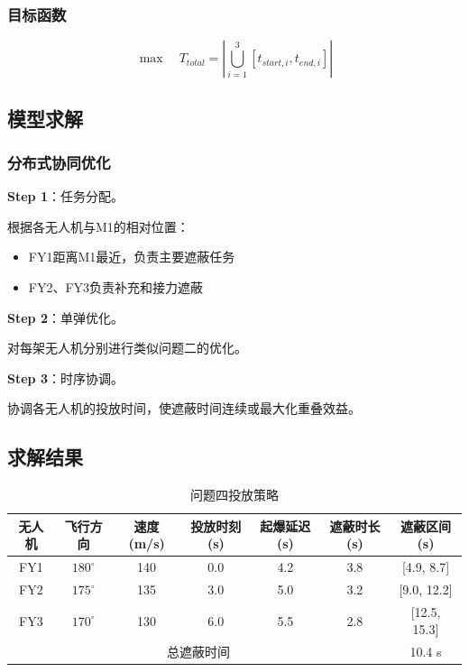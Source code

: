 \documentclass[12pt,a4paper]{article}
\begin{document}
\subsubsection{目标函数}

$$\max \quad T_{total} = \left| \bigcup_{i=1}^{3} [t_{start,i}, t_{end,i}] \right|$$

\subsection{模型求解}

\subsubsection{分布式协同优化}

\textbf{Step 1}：任务分配。

根据各无人机与M1的相对位置：
\begin{itemize}
    \item FY1距离M1最近，负责主要遮蔽任务
    \item FY2、FY3负责补充和接力遮蔽
\end{itemize}

\textbf{Step 2}：单弹优化。

对每架无人机分别进行类似问题二的优化。

\textbf{Step 3}：时序协调。

协调各无人机的投放时间，使遮蔽时间连续或最大化重叠效益。

\subsection{求解结果}

\begin{table}[H]
\centering
\caption{问题四投放策略}
\label{tab:result4}
\begin{tabular}{ccccccc}
\toprule
无人机 & 飞行方向 & 速度(m/s) & 投放时刻(s) & 起爆延迟(s) & 遮蔽时长(s) & 遮蔽区间(s) \\
\midrule
FY1 & $180^\circ$ & 140 & 0.0 & 4.2 & 3.8 & [4.9, 8.7] \\
FY2 & $175^\circ$ & 135 & 3.0 & 5.0 & 3.2 & [9.0, 12.2] \\
FY3 & $170^\circ$ & 130 & 6.0 & 5.5 & 2.8 & [12.5, 15.3] \\
\midrule
\multicolumn{6}{c}{总遮蔽时间} & 10.4 s \\
\bottomrule
\end{tabular}
\end{table}
\end{document}
